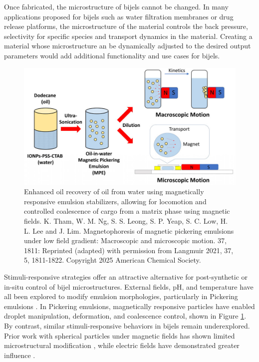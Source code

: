 Once fabricated, the microstructure of bijels cannot be changed. In many applications proposed for bijels such as water filtration membranes
or drug release platforms, the microstructure of the material controls the back pressure, selectivity for specific species and transport
dynamics in the material. \cite{vanoli_bijels_2022, thorson_bijel-templated_2019} Creating a material whose microstructure an be dynamically
adjusted to the desired output parameters would add additional functionality and use cases for bijels. 

\begin{figure}[h]
    \centering
    \includegraphics[scale = 1.5]{figures/introduction/magnetophoresis_emulsion.jpeg}
    \caption{Enhanced oil recovery of oil from water using magnetically responsive emulsion stabilizers, allowing for 
             locomotion and controlled coalescence of cargo from a matrix phase using magnetic fields. \cite{tham_magnetophoresis_2021} 
             K. Tham, W. M. Ng, S. S. Leong, S. P. Yeap, S. C. Low, H. L. Lee and J. Lim. Magnetophoresis of magnetic pickering 
             emulsions under low field gradient: Macroscopic and microscopic motion. 37, 1811: Reprinted (adapted) with permission from 
             Langmuir 2021, 37, 5, 1811-1822. Copyright 2025 American Chemical Society.}
    \label{fig:magnetophoresis_droplet}
\end{figure}

Stimuli-responsive strategies offer an attractive alternative for post-synthetic or in-situ control of bijel microstructures. External fields, 
pH, and temperature have all been explored to modify emulsion morphologies, particularly in Pickering emulsions 
\cite{tham_magnetophoresis_2021, cui_stabilizing_2013}. In Pickering emulsions, magnetically responsive particles have enabled droplet
manipulation, deformation, and coalescence control, shown in Figure \ref{fig:magnetophoresis_droplet}. By contrast, similar stimuli-responsive 
behaviors in bijels remain underexplored. Prior work with spherical particles under magnetic fields has shown limited microstructural modification 
\cite{kim_bijels_2010}, while electric fields have demonstrated greater influence \cite{carmack_tuning_2018}.

